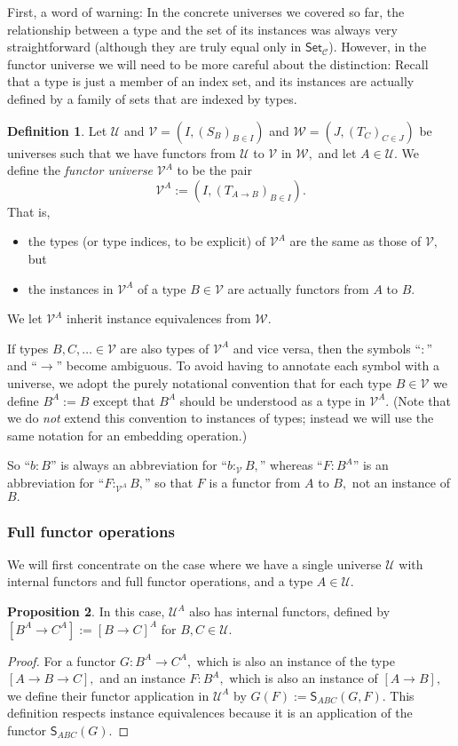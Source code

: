 \documentclass[a4paper]{article}
\theoremstyle{definition}
\newtheorem{definition}{Definition}[section]
\newtheorem{proposition}[definition]{Proposition}
\theoremstyle{remark}
\newcommand{\defn}{\emph}
\newcommand{\C}{\mathcal{C}}
\newcommand{\U}{\mathcal{U}}
\newcommand{\V}{\mathcal{V}}
\newcommand{\W}{\mathcal{W}}
\newcommand{\nm}{\mathsf}
\newcommand{\universe}{\nm}
\newcommand{\Set}{\universe{Set}}
\newcommand{\combinator}{\nm}
\newcommand{\revSubstFun}{\combinator{S}}
\begin{document}
First, a word of warning:
In the concrete universes we covered so far, the relationship between a type and the set of
its instances was always very straightforward (although they are truly equal only in $\Set_\C$).
However, in the functor universe we will need to be more careful about the distinction:
Recall that a type is just a member of an index set, and its instances are actually defined
by a family of sets that are indexed by types.

\begin{definition}
  Let $\U$ and $\V = (I, (S_B)_{B \in I})$ and $\W = (J, (T_C)_{C \in J})$ be universes
  such that we have functors from $\U$ to $\V$ in $\W,$ and let $A \in \U.$
  We define the \defn{functor universe} $\V^A$ to be the pair
  \[\V^A := (I, (T_{A \to B})_{B \in I}).\]
  That is,
  \begin{itemize}
    \item the types (or type indices, to be explicit) of $\V^A$ are the same as those of
    $\V,$ but
    \item the instances in $\V^A$ of a type $B \in \V$ are actually functors from $A$ to $B.$
  \end{itemize}
  We let $\V^A$ inherit instance equivalences from $\W.$
\end{definition}

If types $B,C,\ldots \in \V$ are also types of $\V^A$ and vice versa, then the symbols
``$:$'' and ``$\to$'' become ambiguous. To avoid having to annotate each symbol with a
universe, we adopt the purely notational convention that for each type $B \in \V$ we
define $B^A := B$ except that $B^A$ should be understood as a type in $\V^A.$
(Note that we do \emph{not} extend this convention to instances of types; instead we will
use the same notation for an embedding operation.)

So ``$b : B$'' is always an abbreviation for ``$b :_\V B,$'' whereas ``$F : B^A$'' is an
abbreviation for ``$F :_{\V^A} B,$'' so that $F$ is a functor from $A$ to $B,$ not an
instance of $B.$

\subsubsection*{Full functor operations}

We will first concentrate on the case where we have a single universe $\U$ with internal
functors and full functor operations, and a type $A \in \U.$

\begin{proposition}
  \label{prp:fun-univ-full}
  In this case, $\U^A$ also has internal functors, defined by $[B^A \to C^A] := [B \to C]^A$
  for $B,C \in \U.$
\end{proposition}
\vspace{-1ex}
\begin{proof}
  For a functor $G : B^A \to C^A,$ which is also an instance of the type $[A \to B \to C],$
  and an instance $F : B^A,$ which is also an instance of $[A \to B],$ we define their functor
  application in $\U^A$ by $G(F) := \revSubstFun_{ABC}(G,F).$ This definition
  respects instance equivalences because it is an application of the functor
  $\revSubstFun_{ABC}(G).$
\end{proof}
\end{document}
